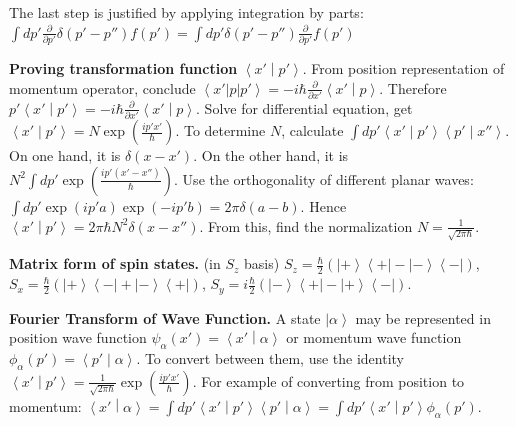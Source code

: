 The last step is justified by applying integration by parts:\\
$\int dp' \frac{\partial }{\partial p'} \delta(p' - p'') f(p') = \int  dp' \delta(p' - p'') \frac{\partial }{\partial p'} f(p')$

\textbf{Proving transformation function} $\left\langle x' \middle| p' \right\rangle $. 
From position representation of momentum operator, conclude $\left\langle x' \right| p \left| p' \right\rangle = - i \hbar \frac{\partial }{\partial x'} \left\langle x' \middle| p \right\rangle $. Therefore $p' \left\langle x' \middle| p' \right\rangle = - i \hbar \frac{\partial }{\partial x'} \left\langle x' \middle| p \right\rangle $. Solve for differential equation, get $\left\langle x' \middle| p' \right\rangle = N \exp\left( \frac{i p' x'}{\hbar} \right) $. To determine $N$, calculate $\int dp' \left\langle x' \middle| p' \right\rangle \left\langle p' \middle| x'' \right\rangle $. On one hand, it is $\delta(x - x')$. On the other hand, it is $N^2 \int dp' \exp\left( \frac{i p' (x' - x'')}{\hbar} \right) $. Use the orthogonality of different planar waves: $\int dp' \exp(i p' a) \exp(- i p' b) = 2 \pi \delta(a-b)$. Hence $\left\langle x' \middle| p' \right\rangle = 2 \pi \hbar N^2 \delta(x - x'')$. From this, find the normalization $N = \frac{1}{\sqrt{2 \pi \hbar} }$.


\textbf{Matrix form of spin states.} (in $S_z$ basis) $S_z = \frac{\hbar}{2} \left( \left| + \right\rangle \left\langle + \right|  - \left| - \right\rangle \left\langle - \right|  \right) $,
$S_x = \frac{\hbar}{2}\left( \left| + \right\rangle \left\langle - \right| + \left| - \right\rangle \left\langle + \right|  \right) $,
$S_y = i \frac{\hbar}{2} \left( \left| - \right\rangle \left\langle + \right| - \left| + \right\rangle \left\langle - \right|  \right) $.


\textbf{Fourier Transform of Wave Function.} A state $\left| \alpha \right\rangle $ may be represented in position wave function $\psi_\alpha (x') = \left\langle x' \middle| \alpha \right\rangle $ or momentum wave function $\phi_\alpha(p') = \left\langle p' \middle| \alpha \right\rangle $. To convert between them, use the identity $\left\langle x' \middle| p' \right\rangle = \frac{1}{\sqrt{2 \pi \hbar} }\exp\left( \frac{i p' x'}{\hbar} \right) $. For example of converting from position to momentum: $\left\langle x' \middle| \alpha \right\rangle = \int dp' \left\langle x' \middle| p' \right\rangle \left\langle p' \middle| \alpha \right\rangle = \int dp' \left\langle x' \middle| p' \right\rangle \phi_\alpha (p')$.


